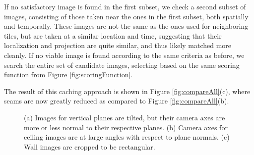 \documentclass[]{spie}  %
\begin{document}
If no satisfactory image is found in the first subset, we check a
second subset of images, consisting of those taken near the ones in
the first subset, both spatially and temporally. These images are not
the same as the ones used for neighboring tiles, but are taken at a
similar location and time, suggesting that their localization and
projection are quite similar, and thus likely matched more cleanly. If
no viable image is found according to the same criteria as before, we
search the entire set of candidate images, selecting based on the same
scoring function from Figure \ref{fig:scoringFunction}.

The result of this caching approach is shown in Figure
\ref{fig:compareAll}(c), where seams are now greatly reduced as
compared to Figure \ref{fig:compareAll}(b).

\begin{figure}
  \centering
  \centering
  \centering
  \caption{(a) Images for vertical planes are tilted, but their camera
    axes are more or less normal to their respective planes. (b)
    Camera axes for ceiling images are at large angles with respect to
    plane normals. (c) Wall images are cropped to be rectangular.}
  \label{fig:projectionAngles}
\end{figure}
\end{document}
